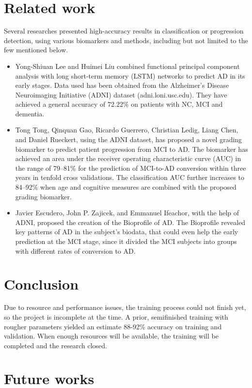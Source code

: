 \documentclass[journal]{IEEEtran}
\begin{document}
\section{Related work}
Several researches presented high-accuracy results in classification or progression detection, using various biomarkers and methods, including but not limited to the few mentioned below.
\begin{itemize}
  \item Yong-Shiuan Lee and Huimei Liu combined functional principal component analysis with long short-term memory (LSTM) networks to predict AD in its early stages. Data used has been obtained from the Alzheimer’s Disease Neuroimaging Initiative (ADNI) dataset (adni.loni.usc.edu). They have achieved a general accuracy of 72.22\% on patients with NC, MCI and dementia. \cite{9}
  \item Tong Tong, Qinquan Gao, Ricardo Guerrero, Christian Ledig, Liang Chen, and Daniel Rueckert, using the ADNI dataset, has proposed a novel grading biomarker to predict patient progression from MCI to AD. The biomarker has achieved an area under the receiver operating characteristic curve (AUC) in the range of 79–81\% for the prediction of MCI-to-AD conversion within three years in tenfold cross validations. The classification AUC further increases to 84–92\% when age and cognitive measures are combined with the proposed grading biomarker. \cite{10}
  \item Javier Escudero, John P. Zajicek, and Emmanuel Ifeachor, with the help of ADNI, proposed the creation of the Bioprofile of AD. The Bioprofile revealed key patterns of AD in the subject’s biodata, that could even help the early prediction at the MCI stage, since it divided the MCI subjects into groups with different rates of conversion to AD. \cite{11}
\end{itemize}

\section{Conclusion}
Due to resource and performance issues, the training process could not finish yet, so the project is incomplete at the time. A prior, semifinished training with rougher parameters yielded an estimate 88-92\% accuracy on training and validation. When enough resources will be available, the training will be completed and the research closed.
\section{Future works}
\end{document}
